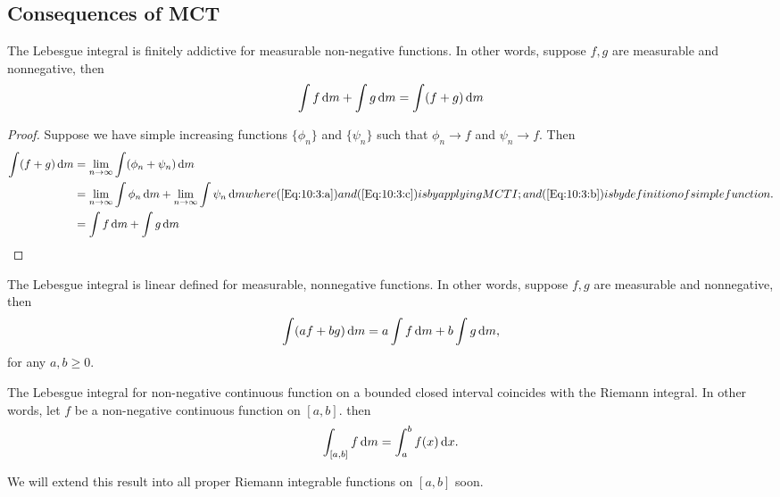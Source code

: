 \subsection{Consequences of MCT}
\begin{proposition}
The Lebesgue integral is finitely addictive for measurable non-negative functions.
In other words, suppose $f,g$ are measurable and nonnegative, then
\[
\int f\,\mathrm{d} m+\int g\,\mathrm{d} m=\int(f+g)\,\mathrm{d} m
\]
\end{proposition}
\begin{proof}
Suppose we have simple increasing functions $\{\phi_n\}$ and $\{\psi_n\}$ such that $\phi_n\to f$ and $\psi_n\to f$. Then
\begin{subequations}
\begin{align}
\int(f+g)\diff m&=\lim_{n\to\infty}\int(\phi_n+\psi_n)\diff m\label{Eq:10:3:a}\\
&=\lim_{n\to\infty}\int\phi_n\diff m+\lim_{n\to\infty}\int\psi_n\diff m\label{Eq:10:3:b}\\
&=\int f\diff m+\int g\diff m\label{Eq:10:3:c}
\end{align}
where (\ref{Eq:10:3:a}) and (\ref{Eq:10:3:c}) is by applying MCT I; and (\ref{Eq:10:3:b}) is by definition of simple function.
\end{subequations}
\end{proof}
\begin{corollary}
The Lebesgue integral is linear defined for measurable, nonnegative functions.
In other words, suppose $f,g$ are measurable and nonnegative, then
\[
\int(af+bg)\,\mathrm{d} m=a\int f\,\mathrm{d} m+b\int g\,\mathrm{d} m,
\]
for any $a,b\ge0$.
\end{corollary}
\begin{proposition}\label{pro:10:14}
The Lebesgue integral for non-negative continuous function on a bounded closed interval coincides with the Riemann integral.
In other words, let $f$ be a non-negative continuous function on $[a,b]$. then
\[
\int_{[a,b]}f\,\mathrm{d} m = \int_a^bf(x)\,\mathrm{d} x.
\]
\end{proposition}
We will extend this result into all proper Riemann integrable functions on $[a,b]$ soon.

